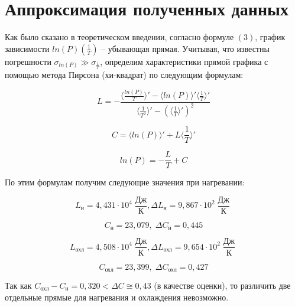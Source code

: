 \documentclass[a4paper, 12pt]{article} %
\begin{document}
\section{Аппроксимация полученных данных}

Как было сказано в теоретическом введении, согласно формуле $(3)$, график зависимости $ln(P)\left( \frac{1}{T}\right)$ -- убывающая прямая. Учитывая, что известны погрешности $\sigma_{ln(P)} \gg \sigma_{\frac{1}{T}}$, определим характеристики прямой графика с помощью метода Пирсона (хи-квадрат) по следующим формулам:

\begin{equation}
    L = - \frac{\langle \frac{ln(P)}{T} \rangle ' - \langle ln(P) \rangle ' \langle \frac{1}{T} \rangle ' }{\langle \frac{1}{T^2} \rangle ' - \left( \langle \frac{1}{T} \rangle ' \right)^2}
\end{equation}

\begin{equation}
    C =  \langle ln(P) \rangle ' + L  \langle \frac{1}{T} \rangle '
\end{equation}

\begin{equation}
    ln(P) = -\frac{L}{T} + C
\end{equation}

По этим формулам получим следующие значения при нагревании:

\begin{equation}
    L_{\text{н}} = 4,431 \cdot 10^4 \; \frac{\text{Дж}}{\text{К}}, \Delta L_{\text{н}} = 9,867 \cdot 10^2 \; \frac{\text{Дж}}{\text{К}}\; 
\end{equation}

\begin{equation}
    C_{\text{н}} = 23,079, \; \Delta C_{\text{н}} = 0,445
\end{equation}

\begin{equation}
    L_{\text{охл}} = 4,508 \cdot 10^4 \; \frac{\text{Дж}}{\text{К}}, \Delta L_{\text{охл}} = 9,654 \cdot 10^2 \; \frac{\text{Дж}}{\text{К}}\; 
\end{equation}

\begin{equation}
    C_{\text{охл}} = 23,399, \; \Delta C_{\text{охл}} = 0,427
\end{equation}

Так как $C_{\text{охл}} -C_{\text{н}} = 0,320 < \Delta C \cong 0,43 $ (в качестве оценки), то различить две отдельные прямые для нагревания и охлаждения невозможно.
\end{document}
